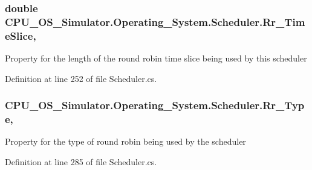 \subsubsection[{Rr\+\_\+\+Time\+Slice}]{\setlength{\rightskip}{0pt plus 5cm}double C\+P\+U\+\_\+\+O\+S\+\_\+\+Simulator.\+Operating\+\_\+\+System.\+Scheduler.\+Rr\+\_\+\+Time\+Slice\hspace{0.3cm}{\ttfamily [get]}, {\ttfamily [set]}}\label{class_c_p_u___o_s___simulator_1_1_operating___system_1_1_scheduler_ab21e8ffe8d0f06388cc2310d3dbb3b48}


Property for the length of the round robin time slice being used by this scheduler 



Definition at line 252 of file Scheduler.\+cs.

\hypertarget{class_c_p_u___o_s___simulator_1_1_operating___system_1_1_scheduler_acc7c4b6c0383e4cf1a65251335f44e6d}{}
\subsubsection[{Rr\+\_\+\+Type}]{ C\+P\+U\+\_\+\+O\+S\+\_\+\+Simulator.\+Operating\+\_\+\+System.\+Scheduler.\+Rr\+\_\+\+Type\hspace{0.3cm}{\ttfamily [get]}, {\ttfamily [set]}}\label{class_c_p_u___o_s___simulator_1_1_operating___system_1_1_scheduler_acc7c4b6c0383e4cf1a65251335f44e6d}


Property for the type of round robin being used by the scheduler 



Definition at line 285 of file Scheduler.\+cs.

\hypertarget{class_c_p_u___o_s___simulator_1_1_operating___system_1_1_scheduler_a6de759cc7e75011ef51456dd95104a95}{}
